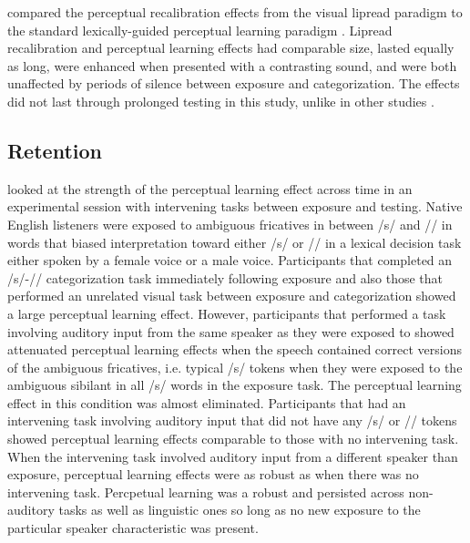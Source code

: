 \citet{vanLinden2007} compared the perceptual recalibration effects from the visual lipread paradigm \citep{Bertelson2003} to the standard lexically-guided perceptual learning paradigm \citep{Norris2003}.  
Lipread recalibration and perceptual learning effects had comparable size, lasted equally as long, were enhanced when presented with a contrasting sound, and were both unaffected by periods of silence between exposure and categorization.  
The effects did not last through prolonged testing in this study, unlike in other studies \citep{Kraljic2005,Eisner2006}.


\subsection{Retention}
\label{sec:retention}

\citet{Kraljic2005} looked at the strength of the perceptual learning effect across time in an experimental session with intervening tasks between exposure and testing. 
Native English listeners were exposed to ambiguous fricatives in between /s/ and /\textesh/ in words that biased interpretation toward either /s/ or /\textesh/ in a lexical decision task either spoken by a female voice or a male voice.
Participants that completed an /s/-/\textesh/ categorization task immediately following exposure and also those that performed an unrelated visual task between exposure and categorization showed a large perceptual learning effect.  
However, participants that performed a task involving auditory input from the same speaker as they were exposed to showed attenuated perceptual learning effects when the speech contained correct versions of the ambiguous fricatives, i.e. typical /s/ tokens when they were exposed to the ambiguous sibilant in all /s/ words in the exposure task.  
The perceptual learning effect in this condition was almost eliminated. 
Participants that had an intervening task involving auditory input that did not have any /s/ or /\textesh/ tokens showed perceptual learning effects comparable to those with no intervening task.  
When the intervening task involved auditory input from a different speaker than exposure, perceptual learning effects were as robust as when there was no intervening task.
Percpetual learning was a robust and persisted across non-auditory tasks as well as linguistic ones so long as no new exposure to the particular speaker characteristic was present.

